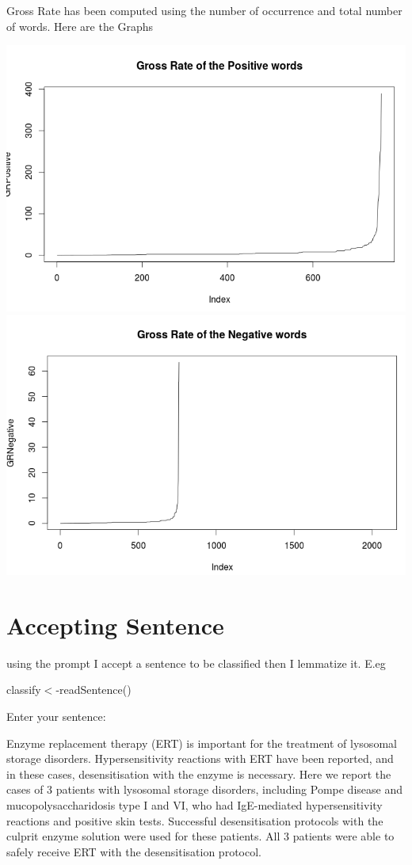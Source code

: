 \documentclass{article}
\begin{document}
	Gross Rate has been computed using the number of occurrence and total number of words. Here are the Graphs
	
	\includegraphics[width=0.8\linewidth]{GRpos.png}\\
	\includegraphics[width=0.8\linewidth]{GRneg.png}\\
\section{Accepting Sentence}
using the prompt I accept a sentence to be classified then I lemmatize it. 
E.eg

classify$<$-readSentence()

Enter your sentence: 

Enzyme replacement therapy (ERT) is important for the treatment of lysosomal storage disorders. Hypersensitivity reactions with ERT have been reported, and in these cases, desensitisation with the enzyme is necessary. Here we report the cases of 3 patients with lysosomal storage disorders, including Pompe disease and mucopolysaccharidosis type I and VI, who had IgE-mediated hypersensitivity reactions and positive skin tests. Successful desensitisation protocols with the culprit enzyme solution were used for these patients. All 3 patients were able to safely receive ERT with the desensitisation protocol.
\end{document}
